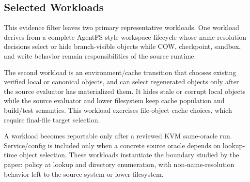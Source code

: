 \subsection{Selected Workloads}

This evidence filter leaves two primary representative workloads. One workload
derives from a complete AgentFS-style workspace lifecycle whose
name-resolution decisions select or hide branch-visible objects while COW,
checkpoint, sandbox, and write behavior remain responsibilities of the source
runtime.

The second workload is an environment/cache transition that chooses existing
verified local or canonical objects, and can select regenerated objects only
after the source evaluator has materialized them. It hides stale or corrupt
local objects while the source evaluator and lower filesystem keep cache
population and build/test semantics. This workload exercises file-object cache
choices, which require final-file target selection.

A workload becomes reportable only after a reviewed KVM same-oracle run.
Service/config is included only when a concrete source oracle depends on
lookup-time object selection. These workloads instantiate the boundary studied
by the paper: policy at lookup and directory enumeration, with
non-name-resolution behavior left to the source system or lower filesystem.
